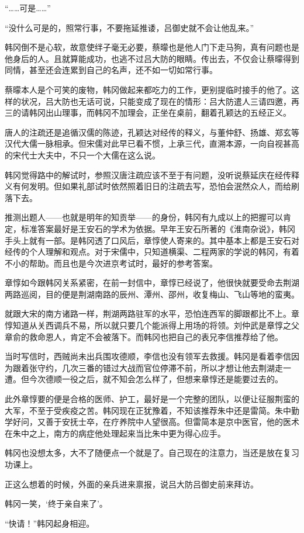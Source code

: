 “……可是……”

“没什么可是的，照常行事，不要拖延推诿，吕御史就不会让他乱来。”

韩冈倒不是心软，故意使绊子毫无必要，蔡曚也是他人门下走马狗，真有问题也是他身后的人。且就算能成功，也逃不过吕大防的眼睛。传出去，不仅会让蔡曚得到同情，甚至还会连累到自己的名声，还不如一切如常行事。

蔡曚本人是个可笑的废物，韩冈做起来都吃力的工作，更别提临时接手的他了。这样的状况，吕大防也无话可说，只能变成了现在的情形：吕大防遣人三请四邀，再三的请韩冈出山理事，而韩冈不加理会，正坐在桌前，翻着孔颖达的五经正义。

唐人的注疏还是追循汉儒的陈迹，孔颖达对经传的释义，与董仲舒、扬雄、郑玄等汉代大儒一脉相承。但宋儒对此早已看不惯，上承三代，直溯本源，一向自视甚高的宋代士大夫中，不只一个大儒在这么说。

韩冈觉得路中的解试时，参照汉唐注疏应该不至于有问题，没听说蔡延庆在经传释义有何发明。但如果礼部试时依然照着旧日的注疏去写，恐怕会泯然众人，而给刷落下去。

推测出题人——也就是明年的知贡举——的身份，韩冈有九成以上的把握可以肯定，标准答案最好是王安石的学术为依据。早年王安石所著的《淮南杂说》，韩冈手头上就有一部。是韩冈透了口风后，章惇使人寄来的。其中基本上都是王安石对经传的个人理解和观点。对于宋儒中，只知道横渠、二程两家的学说的韩冈，有着不小的帮助。而且也是今次进京考试时，最好的参考答案。

章惇如今跟韩冈关系紧密，在前一封信中，章惇已经说了，他很快就要受命去荆湖两路巡阅，目的便是荆湖南路的辰州、潭州、邵州，收复梅山、飞山等地的蛮夷。

就跟大宋的南方诸路一样，荆湖两路驻军的水平，恐怕连西军的脚跟都比不上。章惇知道从关西调兵不易，所以就只要几个能派得上用场的将领。刘仲武是章惇之父章俞的救命恩人，肯定不会被落下。而韩冈也把自己的表兄李信推荐给了他。

当时写信时，西贼尚未出兵围攻德顺，李信也没有领军去救援。韩冈是看着李信因为跟着张守约，几次三番的错过大战而官位停滞不前，所以才想让他去荆湖走一遭。但今次德顺一役之后，就不知会怎么样了，但想来章惇还是能要过去的。

此外章惇要的便是合格的医师、护工，最好是一个完整的团队，以便让征服荆蛮的大军，不至于受疾疫之苦。韩冈现在正犹豫着，不知该推荐朱中还是雷简。朱中勤学好问，又善于安抚士卒，在疗养院中人望很高。但雷简本是京中医官，他的医术在朱中之上，南方的病症他处理起来当比朱中更为得心应手。

韩冈也没想太多，大不了随便点一个就是了。自己现在的注意力，当还是放在复习功课上。

正这么想着的时候，外面的亲兵进来禀报，说吕大防吕御史前来拜访。

韩冈一笑，‘终于亲自来了’。

“快请！”韩冈起身相迎。

